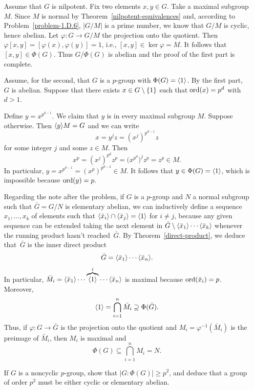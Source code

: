 \begin{solution} Assume that $G$ is nilpotent. Fix two elements $x,y\in G$. Take a maximal subgroup $M$. Since $M$ is normal by Theorem~\ref{nilpotent-equivalences} and, according to Problem~\ref{problem-1.D.6}, $|G/M|$ is a prime number, we know that $G/M$ is cyclic, hence abelian. Let $\varphi\colon G\to G/M$ the projection onto the quotient. Then $\varphi[x,y]=[\varphi(x),\varphi(y)]=1$, i.e., $[x,y]\in\ker\varphi = M$. It follows that $[x,y]\in\Phi(G)$. Thus $G/\Phi(G)$ is abelian and the proof of the first part is complete.

Assume, for the second, that $G$ is a $p$-group with $\Phi(G)=\langle1\rangle$. By the first part,~$G$ is abelian. Suppose that there exists $x\in G\setminus\{1\}$ such that ${\rm ord}(x)=p^d$ with $d>1$.

Define $y=x^{p^{d-1}}$. We claim that $y$ is in every maximal subgroup $M$. Suppose otherwise. Then $\langle y\rangle M=G$ and we can write
$$
    x = y^jz = (x^j)^{p^{d-1}}z
$$
for some integer $j$ and some $z\in M$. Then
$$
    x^p=(x^j)^{p^d}z^p=\big(x^{p^{d}}\big)^jz^p=z^p\in M.
$$
In particular, $y=x^{p^{d-1}}=(x^p)^{p^{d-2}}\in M$. It follows that $y\in\Phi(G)=\langle1\rangle$, which is impossible because ${\rm ord}(y)=p$. 

\bigskip

Regarding the note after the problem, if $G$ is a $p$-group and $N$ a normal subgroup such that $\bar G=G/N$ is elementary abelian, we can inductively define a sequence $x_1,\dots,x_k$ of elements such that $\langle\bar x_i\rangle\cap\langle\bar x_j\rangle=\langle1\rangle$ for $i\ne j$, because any given sequence can be extended taking the next element in $\bar G\setminus\langle\bar x_1\rangle\cdots\langle\bar x_k\rangle$ whenever the running product hasn't reached~$\bar G$. By Theorem~\ref{direct-product}, we deduce that~$\bar G$ is the inner direct product
$$
    \bar G = \langle\bar x_1\rangle\cdots\langle\bar x_n\rangle.
$$
In particular, $\bar M_i=\langle\bar x_1\rangle\cdots\overbrace{\langle1\rangle}^i\cdots\langle\bar x_n\rangle$ is maximal because ${\rm ord}(\bar x_i)=p$. Moreover,
$$
    \langle1\rangle = \bigcap_{i=1}^n\bar M_i \supseteq\Phi(\bar G).
$$
Thus, if $\varphi\colon G\to \bar G$ is the projection onto the quotient and $M_i=\varphi^{-1}(\bar M_i)$ is the preimage of $\bar M_i$, then $M_i$ is maximal and
$$
    \Phi(G)\subseteq\bigcap_{i=1}^nM_i=N.
$$

 \end{solution}

\begin{probl}\label{problem-1.D.9}
    If $G$ is a noncyclic $p$-group, show that $|G:\Phi(G)|\ge p^2$, and deduce that a group of order $p^2$ must be either cyclic or elementary abelian.
\end{probl}

